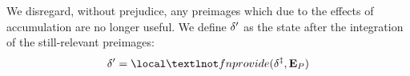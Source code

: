 We disregard, without prejudice, any preimages which due to the effects of accumulation are no longer useful. We define $\accountspostpreimage$ as the state after the integration of the still-relevant preimages:
\begin{equation}
  \accountspostpreimage = \local¬fnprovide(\accountspostxfer, \xtpreimages)
\end{equation}
